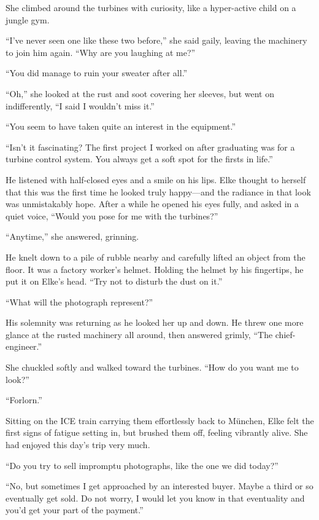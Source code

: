 She climbed around the turbines with curiosity, like a hyper-active child on a jungle gym.

``I've never seen one like these two before,'' she said gaily, leaving the machinery to join him again. ``Why are you laughing at me?''

``You did manage to ruin your sweater after all.''

``Oh,'' she looked at the rust and soot covering her sleeves, but went on indifferently, ``I said I wouldn't miss it.''

``You seem to have taken quite an interest in the equipment.''

``Isn't it fascinating? The first project I worked on after graduating was for a turbine control system. You always get a soft spot for the firsts in life.''

He listened with half-closed eyes and a smile on his lips. Elke thought to herself that this was the first time he looked truly happy---and the radiance in that look was unmistakably hope. After a while he opened his eyes fully, and asked in a quiet voice, ``Would you pose for me with the turbines?''

``Anytime,'' she answered, grinning.

He knelt down to a pile of rubble nearby and carefully lifted an object from the floor. It was a factory worker's helmet. Holding the helmet by his fingertips, he put it on Elke's head. ``Try not to disturb the dust on it.''

``What will the photograph represent?''

His solemnity was returning as he looked her up and down. He threw one more glance at the rusted machinery all around, then answered grimly, ``The chief-engineer.''

She chuckled softly and walked toward the turbines. ``How do you want me to look?''

``Forlorn.''

\sectionline

Sitting on the ICE train carrying them effortlessly back to München, Elke felt the first signs of fatigue setting in, but brushed them off, feeling vibrantly alive. She had enjoyed this day's trip very much.

``Do you try to sell impromptu photographs, like the one we did today?''

``No, but sometimes I get approached by an interested buyer. Maybe a third or so eventually get sold. Do not worry, I would let you know in that eventuality and you'd get your part of the payment.''

